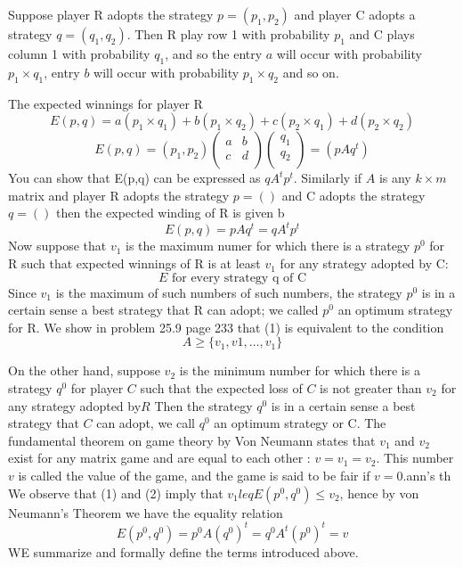 \documentclass[]{report}
\begin{document}
Suppose player R adopts the strategy $p=(p_1,p_2)$ and player C adopts a strategy $q=(q_1,q_2)$. Then R play row 1 with 
probability $p_1$ and C plays column 1 with probability $q_1$, and so the entry $a$ will occur with probability $p_1 \times q_1$, entry $b$ will occur with probability $p_1 \times q_2$ and so on.

The expected winnings for player R
\[ E(p,q) = a(p_1 \times q_1) + b(p_1 \times q_2) + c(p_2 \times q_1) + d(p_2 \times q_2) \]
\[ E(p,q) = (p_1,p_2) \left(\begin{array}{cc} 
a & b \\
c & d \\ \end{array} \right)\left(\begin{array}{c} 
q_1\\
q_2\\ \end{array} \right) = (p A q^t) \]
You can show that E(p,q) can be expressed as $q A^t p^t$.
\smallskip
Similarly if $A$ is any $k \times m$ matrix and player R adopts the strategy $p=()$ and C adopts the strategy $q=()$ then the expected winding of R is given b
\[ E(p,q) =  pAq^t = q A^t p^t \]
Now suppose that $v_1$ is the maximum numer for which there is a strategy $p^0$ for R such that expected winnings of R is at least $v_1$ for any strategy adopted by C:
\[E  \mbox{ for every strategy q of C}\]
Since $v_1$ is the maximum of such numbers of such numbers, the strategy $p^0$ is in a certain sense a best strategy that R can adopt; we called $p^0$ an optimum strategy for R.
We show in problem 25.9 page 233 that (1) is equivalent to the condition
\[ A \geq \{ v_1,v1,\ldots,v_1 \}\]

On the other hand, suppose $v_2$ is the minimum number for which there is a strategy $q^0$ for player $C$ such that 
the expected loss of $C$ is not greater than $v_2$ for any strategy adopted by$R$
Then the strategy $q^0$ is in a certain sense a best strategy that $C$ can adopt, we call $q^0$ an optimum strategy
or C.
The fundamental theorem on game theory by Von Neumann states that $v_1$ and $v_2$ exist for any matrix game
and are equal to each other : $v = v_1 = v_2$. This number $v$ is called the value of the game, and the game is said to be fair if $v=0$.ann's th
We observe that (1) and (2) imply that $v_1 leq E(p^0,q^0) \leq v_2$, hence by von Neumann's Theorem we have the 
equality relation
\[ E(p^0,q^0) = p^0 A (q^0)^{t} = q^0 A^t (p^0)^{t} = v\]
WE summarize and formally define the terms introduced above.
\end{document}
